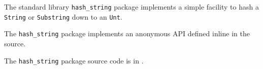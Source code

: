 
The standard library {\tt hash\_string} package implements a simple facility to 
hash a {\tt String} or {\tt Substring} down to an {\tt Unt}.

The {\tt hash\_string} package implements an anonymous API defined inline in the source.

The {\tt hash\_string} package source code is in .



